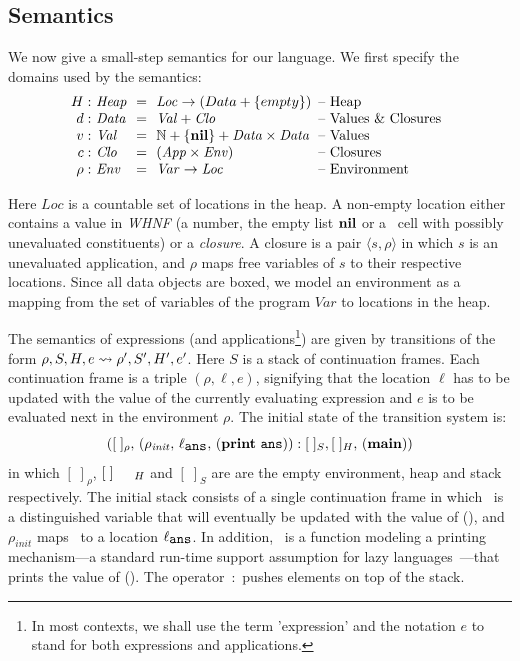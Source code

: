 \documentclass[9pt,preprint,nonatbib]{sigplanconf}
\newcommand{\stk}{{S}}
\begin{document}
\subsection{Semantics}\label{sec:semantics}
We now give  a small-step semantics for our  language.
We first specify the domains used by the semantics:
\[
\renewcommand{\arraystretch}{1}
\begin{array}{@{}r@{\ }l@{\ \ }c@{\ \ }l@{\hspace{0.5em}}l}
\heap: & \mathit{Heap} & =&\mathit{Loc} \rightarrow (Data + \{empty\}) & \mbox{-- Heap}\\
d: & \mathit{Data} &=&\mathit{Val} + \mathit{Clo} & \mbox{-- Values \& Closures} \\
v:   & \mathit{Val} &=& \mathbb{N} + \{\NIL\} + \mathit{Data \times Data}& \mbox{-- Values}\\
c:   & \mathit{Clo} &=& \mathit{(App \times Env)}& \mbox{-- Closures}\\
\rho: & \mathit{Env} &=&\mathit{Var} \rightarrow \mathit{Loc} &
\mbox{-- Environment} \\
\end{array}
\]


Here  $\mathit{Loc}$ is  a countable  set  of locations  in the  heap.
A non-empty location either contains  a value in  \emph{WHNF} (a  number, the
empty  list  $\mbox{$\mathbf{ nil}$}$ or  a  \CONS\  cell  with  possibly  unevaluated
constituents) or  a {\em closure}.   A closure  is a pair  $\langle s,
\rho\rangle$ in  which $s$ is  an unevaluated application,  and $\rho$
maps free variables of $s$ to their respective locations. Since all data objects are boxed, we model an environment as a mapping
from the set  of variables of the program  $\mathit{Var}$ to locations
in the  heap.  


The  semantics  of   expressions  (and  applications\footnote{In  most
 contexts, we  shall use the  term 'expression' and the  notation $e$
to stand   for both expressions and applications.}) 
are given by transitions of the form $\rho, \stk, \heap, e \rightsquigarrow
\rho',  \stk', \heap',  e'$.  Here  $\stk$ is  a stack  of continuation
frames.  Each  continuation frame  is a triple $(\rho,  \ell, e)$,
signifying that the  location $\ell$ has to be updated  with the value
of the  currently evaluating  expression and $e$  is to  be evaluated
next  in the  environment $\rho$.  
The  initial  state  of  the  transition  system  is:
\[([\;]_\rho,\,     (\rho_\mathit{init},     \,    \ell_{\mathbf{\mbox{\tt ans}}}     ,\,
(\mathbf{print}~\mathbf{\mbox{\tt ans}})):[\;]_{S},   [\;]_{H},\,   (\mathbf{main}))\]  in   which
$[\;]_\rho$, $[\;]_{\mbox  \footnotesize {H}}$ and $[\;]_{S}$  are are
the empty environment, heap and  stack respectively. The initial stack
consists  of  a  single  continuation   frame  in  which  \ans\  is  a
distinguished variable that will eventually  be updated with the value
of  (\mainpgm),  and  $\rho_\mathit{init}$  maps \ans\  to  a  location
$\ell_{\mathbf{\mbox{\tt ans}}}$.  In addition, \print\ is a function modeling a printing
mechanism---a   standard   run-time   support  assumption   for   lazy
languages~\cite{Jones87}---that prints  the value of  (\mainpgm).  The
operator~$:$ pushes elements on top of the stack.
\end{document}
